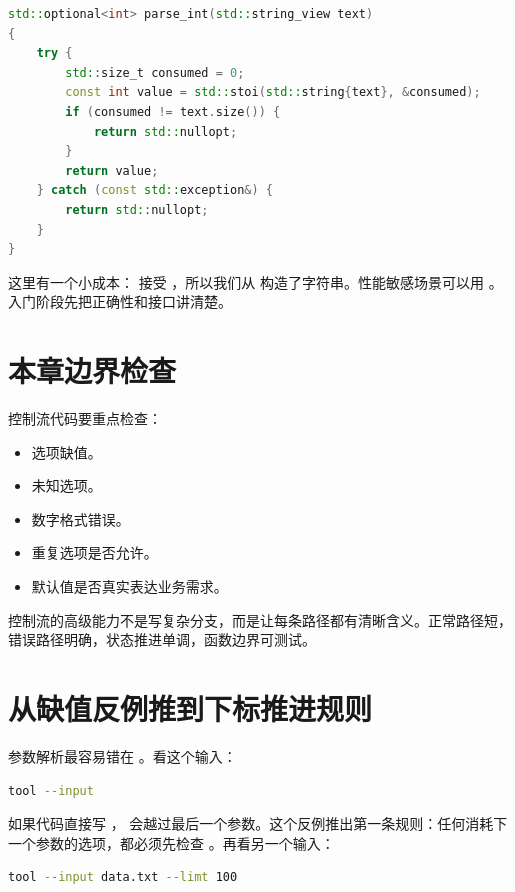 \begin{lstlisting}[language=C++,caption={把字符串转整数变成独立函数}]
std::optional<int> parse_int(std::string_view text)
{
    try {
        std::size_t consumed = 0;
        const int value = std::stoi(std::string{text}, &consumed);
        if (consumed != text.size()) {
            return std::nullopt;
        }
        return value;
    } catch (const std::exception&) {
        return std::nullopt;
    }
}
\end{lstlisting}

这里有一个小成本： 接受 ，所以我们从  构造了字符串。性能敏感场景可以用 。入门阶段先把正确性和接口讲清楚。

\section{本章边界检查}

控制流代码要重点检查：

\begin{itemize}
  \item 选项缺值。
  \item 未知选项。
  \item 数字格式错误。
  \item 重复选项是否允许。
  \item 默认值是否真实表达业务需求。
\end{itemize}

\begin{keyidea}
控制流的高级能力不是写复杂分支，而是让每条路径都有清晰含义。正常路径短，错误路径明确，状态推进单调，函数边界可测试。
\end{keyidea}

\section{从缺值反例推到下标推进规则}

参数解析最容易错在 。看这个输入：

\begin{lstlisting}[language=bash,caption={缺少参数值的输入}]
tool --input
\end{lstlisting}

如果代码直接写 ， 会越过最后一个参数。这个反例推出第一条规则：任何消耗下一个参数的选项，都必须先检查 。再看另一个输入：

\begin{lstlisting}[language=bash,caption={未知选项不能静默忽略}]
tool --input data.txt --limt 100
\end{lstlisting}

